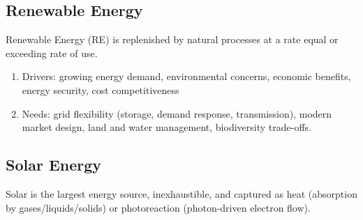 \documentclass[12pt, a4paper]{article}
\begin{document}
\begin{multicols*}{3}
\colbreak
\section{Renewable Energy}
Renewable Energy (RE) is replenished by natural processes at a rate equal or exceeding rate of use.
\begin{enumerate}[\roman*.]
  \item Drivers: growing energy demand, environmental concerns, economic benefits, energy security, cost competitiveness 
  \item Needs: grid flexibility (storage, demand response, transmission), modern market design, land and water management, biodiversity trade-offs.
\end{enumerate}

\subsection{Solar Energy}
Solar is the largest energy source, inexhaustible, and captured as heat (absorption by gases/liquids/solids) or photoreaction (photon-driven electron flow).


\end{multicols*}
\end{document}
